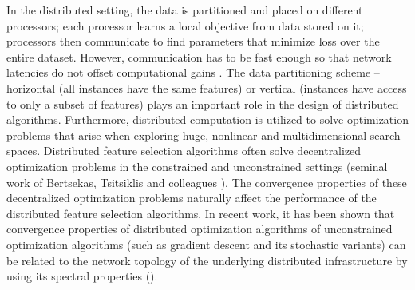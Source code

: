 In the distributed setting, the data is partitioned and
placed on different processors; each processor learns a local objective from data stored on it; processors then communicate to find parameters that
minimize loss over the entire dataset. However, communication has to be fast
enough so that network latencies do not offset computational gains \cite{Kargupta_98a}. The data partitioning
scheme -- horizontal (all instances have the same features) or
vertical (instances have access to only a subset of features) plays an
important role in the design of distributed algorithms. Furthermore, distributed computation is utilized to solve optimization problems that arise when exploring huge, nonlinear and multidimensional search spaces. Distributed feature selection algorithms often solve decentralized optimization problems in the constrained and unconstrained settings (seminal work of Bertsekas, Tsitsiklis and colleagues \cite{Tsitsiklis_86,Tsitsiklis_84,Bertsekas_97}). The convergence properties of these decentralized optimization problems naturally affect the performance of the distributed feature selection algorithms. In recent work, it has been shown that convergence properties of distributed optimization algorithms of unconstrained optimization algorithms (such as gradient descent and its stochastic variants) can be related to the network topology of the underlying distributed infrastructure by using its spectral properties (\cite{Boyd_06,Shah_09,Dimakis_06,Benezit_10}).


